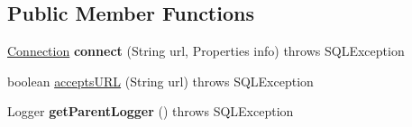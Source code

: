 \subsection*{Public Member Functions}
\begin{DoxyCompactItemize}
\item 
\mbox{\label{classcom_1_1mysql_1_1fabric_1_1jdbc_1_1_fabric_my_s_q_l_driver_a8932341c0b1814d9dc919880f4503b97}} 
\mbox{\hyperlink{interfacecom_1_1mysql_1_1jdbc_1_1_connection}{Connection}} {\bfseries connect} (String url, Properties info)  throws S\+Q\+L\+Exception 
\item 
boolean \mbox{\hyperlink{classcom_1_1mysql_1_1fabric_1_1jdbc_1_1_fabric_my_s_q_l_driver_aff98c80cb762b27f7548fb5d35a2c1f0}{accepts\+U\+RL}} (String url)  throws S\+Q\+L\+Exception 
\item 
\mbox{\label{classcom_1_1mysql_1_1fabric_1_1jdbc_1_1_fabric_my_s_q_l_driver_af820f87e51302abaae4f107836caadcf}} 
Logger {\bfseries get\+Parent\+Logger} ()  throws S\+Q\+L\+Exception 
\end{DoxyCompactItemize}
